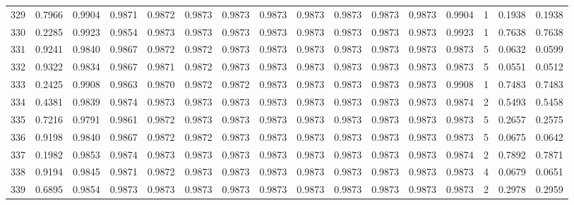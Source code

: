 \begin{tabular}{lrrrrrrrrrrrrrrr}
329 &      0.7966 &  0.9904 &  0.9871 &  0.9872 &  0.9873 &  0.9873 &  0.9873 &  0.9873 &  0.9873 &  0.9873 &   0.9873 &     0.9904 &      1 &                    0.1938 &                     0.1938 \\
330 &      0.2285 &  0.9923 &  0.9854 &  0.9873 &  0.9873 &  0.9873 &  0.9873 &  0.9873 &  0.9873 &  0.9873 &   0.9873 &     0.9923 &      1 &                    0.7638 &                     0.7638 \\
331 &      0.9241 &  0.9840 &  0.9867 &  0.9872 &  0.9872 &  0.9873 &  0.9873 &  0.9873 &  0.9873 &  0.9873 &   0.9873 &     0.9873 &      5 &                    0.0632 &                     0.0599 \\
332 &      0.9322 &  0.9834 &  0.9867 &  0.9871 &  0.9872 &  0.9873 &  0.9873 &  0.9873 &  0.9873 &  0.9873 &   0.9873 &     0.9873 &      5 &                    0.0551 &                     0.0512 \\
333 &      0.2425 &  0.9908 &  0.9863 &  0.9870 &  0.9872 &  0.9872 &  0.9873 &  0.9873 &  0.9873 &  0.9873 &   0.9873 &     0.9908 &      1 &                    0.7483 &                     0.7483 \\
334 &      0.4381 &  0.9839 &  0.9874 &  0.9873 &  0.9873 &  0.9873 &  0.9873 &  0.9873 &  0.9873 &  0.9873 &   0.9873 &     0.9874 &      2 &                    0.5493 &                     0.5458 \\
335 &      0.7216 &  0.9791 &  0.9861 &  0.9872 &  0.9873 &  0.9873 &  0.9873 &  0.9873 &  0.9873 &  0.9873 &   0.9873 &     0.9873 &      5 &                    0.2657 &                     0.2575 \\
336 &      0.9198 &  0.9840 &  0.9867 &  0.9872 &  0.9872 &  0.9873 &  0.9873 &  0.9873 &  0.9873 &  0.9873 &   0.9873 &     0.9873 &      5 &                    0.0675 &                     0.0642 \\
337 &      0.1982 &  0.9853 &  0.9874 &  0.9873 &  0.9873 &  0.9873 &  0.9873 &  0.9873 &  0.9873 &  0.9873 &   0.9873 &     0.9874 &      2 &                    0.7892 &                     0.7871 \\
338 &      0.9194 &  0.9845 &  0.9871 &  0.9872 &  0.9873 &  0.9873 &  0.9873 &  0.9873 &  0.9873 &  0.9873 &   0.9873 &     0.9873 &      4 &                    0.0679 &                     0.0651 \\
339 &      0.6895 &  0.9854 &  0.9873 &  0.9873 &  0.9873 &  0.9873 &  0.9873 &  0.9873 &  0.9873 &  0.9873 &   0.9873 &     0.9873 &      2 &                    0.2978 &                     0.2959 \\

\end{tabular}
